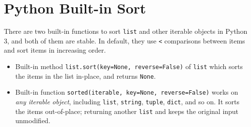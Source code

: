 \documentclass[../main.tex]{subfiles}
\begin{document}
 
 
 
 
 
 
 


\section{Python Built-in Sort}
\label{python_built_in_sort}
There are two built-in functions to sort \texttt{list} and other iterable objects in Python 3, and both of them are stable. In default, they use \texttt{<} comparisons between items and sort items in increasing order. 
\begin{itemize}
    \item Built-in method \texttt{list.sort(key=None, reverse=False)} of \texttt{list} which sorts the items in the list in-place, and returns \texttt{None}.
    \item Built-in function \texttt{sorted(iterable, key=None, reverse=False)} works on \textit{any iterable object}, including \texttt{list}, \texttt{string}, \texttt{tuple}, \texttt{dict}, and so on. It sorts the items out-of-place; returning another \texttt{list} and keeps the original input unmodified. 
\end{itemize}
\end{document}
